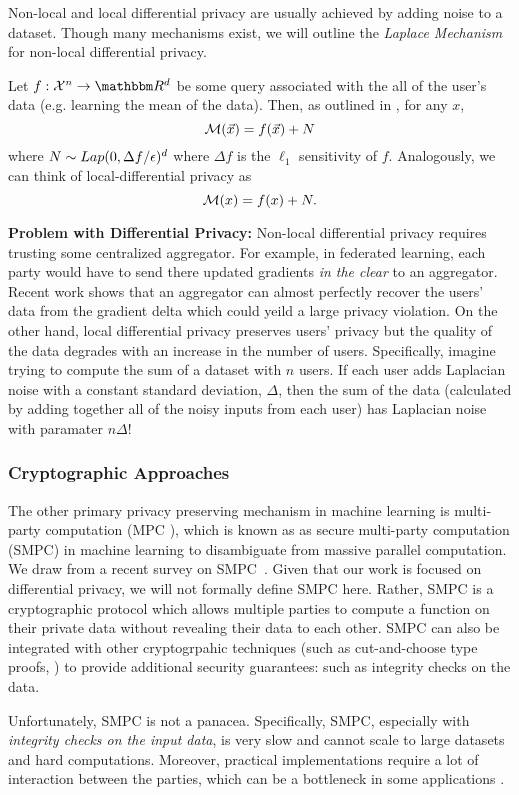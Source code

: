 \documentclass[11pt]{article}
\begin{document}
Non-local and local differential privacy are usually achieved by adding noise to a dataset.
Though many mechanisms exist, we will outline the \emph{Laplace Mechanism} for non-local differential privacy.

Let $f: \mathcal{X}^n \rightarrow \R^d$ be some query associated with the all of the user's data (e.g. learning the mean of the data).
Then, as outlined in \cite{Bassily_2015}, for any $x$,
\[
	\mathcal{M}(\vec{x}) = f(\vec{x}) + N
\]
where $N \sim Lap(0, \Delta f/ \epsilon)^{d}$ where $\Delta f$ is the $\ell_1$ sensitivity of $f$.
Analogously, we can think of local-differential privacy as \[
	\mathcal{M}(x) = f(x) + N.
\]

\textbf{Problem with Differential Privacy:} Non-local differential privacy requires trusting some centralized aggregator.
For example, in federated learning, each party would have to send there updated gradients \emph{in the clear} to an aggregator.
Recent work  shows that an aggregator can almost perfectly recover the users' data from the gradient delta which could yeild a large privacy violation.
On the other hand, local differential privacy preserves users' privacy but the quality of the data degrades with an increase in the number of users.
Specifically, imagine trying to compute the sum of a dataset with $n$ users.
If each user adds Laplacian noise with a constant standard deviation, $\Delta$, then the sum of the data (calculated by adding together all of the noisy inputs from each user) has Laplacian noise with paramater $n \Delta$!

\subsubsection*{Cryptographic Approaches}
The other primary privacy preserving mechanism in machine learning is multi-party computation (MPC ), which is known as as secure multi-party computation (SMPC) in machine learning to disambiguate from massive parallel computation.
We draw from a recent survey on SMPC~\cite{zhou2024secure}.
Given that our work is focused on differential privacy, we will not formally define SMPC here.
Rather, SMPC is a cryptographic protocol which allows multiple parties to compute a function on their private data without revealing their data to each other.
SMPC can also be integrated with other cryptogrpahic techniques (such as cut-and-choose type proofs, ) to provide additional security guarantees: such as integrity checks on the data.

Unfortunately, SMPC is not a panacea.
Specifically, SMPC, especially with \emph{integrity checks on the input data}, is very slow and cannot scale to large datasets and hard computations.
Moreover, practical implementations require a lot of interaction between the parties, which can be a bottleneck in some applications \cite{zhao2019secure}.
\end{document}
